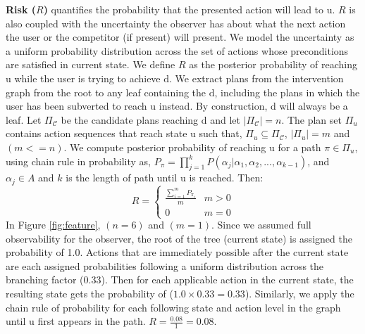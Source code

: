 \documentclass[letterpaper]{article}
\theoremstyle{plain}
\begin{document}
\textbf{Risk ($R$)} quantifies the probability that the presented action will lead to $\mathrm{u}$. $R$ is also coupled with the uncertainty the observer has about what the next action the user or the competitor (if present) will present. We model the uncertainty as a uniform probability distribution across the set of actions whose preconditions are satisfied in current state. We define $R$ as the posterior probability of reaching $\mathrm{u}$ while the user is trying to achieve $\mathrm{d}$. We extract plans from the intervention graph from the root to any leaf containing the $\mathrm{d}$, including the plans in which the user has been subverted to reach $\mathrm{u}$ instead. By construction, $\mathrm{d}$ will always be a leaf.
Let $\Pi_{\mathcal{C}}$ be the candidate plans reaching $\mathrm{d}$ and let $\left | \Pi_{\mathcal{C}} \right |=n$. The plan set $\Pi_{u}$ contains action sequences that reach state $\mathrm{u}$ such that, $\Pi_{u} \subseteq \Pi_{\mathcal{C}}$, $\left | \Pi_{u} \right |=m$ and $(m<=n)$. We compute posterior probability of reaching $\mathrm{u}$ for a path $\pi \in \Pi_{u}$, using chain rule in probability as, $P_{\pi}=\prod_{j=1}^{k}P(\alpha_j|\alpha_1, \alpha_2,...,\alpha_{k-1})$, and $\alpha_{j} \in A$ and $k$ is the length of path until $\mathrm{u}$ is reached. Then: 
\begin{equation*} 
R = \left\{\begin{matrix} \frac{\sum_{i=1}^{m}P_{\pi_i}}{m} & m>0\\ 0 &  m=0 \end{matrix}\right.
\end{equation*}
In Figure \ref{fig:feature}, $(n=6)$ and $(m=1)$. Since we assumed full observability for the observer, the root of the tree (current state) is assigned the probability of 1.0. Actions that are immediately possible after the current state are each assigned probabilities following a uniform distribution across the branching factor (0.33). Then for each applicable action in the current state, the resulting state gets the probability of ($1.0\times0.33=0.33$). Similarly, we apply the chain rule of probability for each following state and action level in the graph until $\mathrm{u}$ first appears in the path. $R=\frac{0.08}{1}=0.08$.
\end{document}
